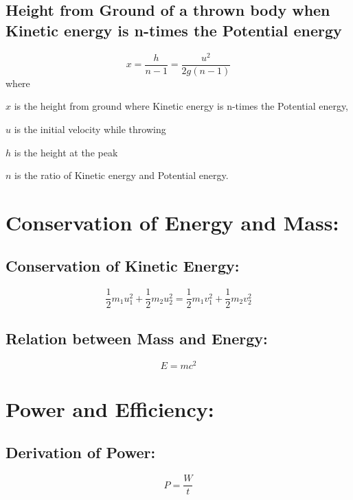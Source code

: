 \documentclass[a4paper]{report}
\begin{document}
        \subsection{Height from Ground of a thrown body when Kinetic energy is n-times the Potential energy}  
            \begin{equation}
                x = \frac{h}{n - 1} = \frac{u^2}{2g(n - 1)}
            \end{equation}
            where 
            \begin{description}
                \item $x$ is the height from ground where Kinetic energy is n-times the Potential energy,
                \item $u$ is the initial velocity while throwing
                \item $h$ is the height at the peak
                \item $n$ is the ratio of Kinetic energy and Potential energy.
            \end{description}
    \section{Conservation of Energy and Mass: }
        \subsection{Conservation of Kinetic Energy: }
            \begin{equation}
                \frac{1}{2} m_1 u_1^2 + \frac{1}{2} m_2 u_2^2 = \frac{1}{2} m_1 v_1^2 + \frac{1}{2} m_2 v_2^2
            \end{equation}
        \subsection{Relation between Mass and Energy: }
            \begin{equation}
                E = mc^2
            \end{equation}
    \section{Power and Efficiency: }
        \subsection{Derivation of Power: }
            \begin{equation}
                P = \frac{W}{t}
            \end{equation}
\end{document}
